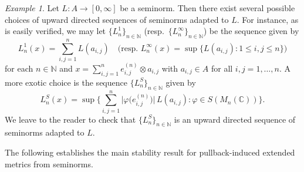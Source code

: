 \documentclass[11pt, a4paper, oneside, final, reqno]{amsart}
\newcommand{\bbN}{\mathbb{N}}
\newcommand{\bbC}{\mathbb{C}}
\theoremstyle{definition}
\theoremstyle{plain}
\theoremstyle{remark}
\newtheorem{example}[definition]{Example}
\numberwithin{equation}{section}
\begin{document}
\begin{example}\label{upward-ex}
    Let $L \colon A \to [0, \infty]$  be a seminorm. Then there exist several possible choices of upward directed sequences of seminorms adapted to $L$. For instance, as is easily verified, we may let $\{L_n^1\}_{n\in \bbN}$ (resp.~$\{L_n^\infty\}_{n\in \bbN}$) be the sequence given by
    \begin{equation*}
        L_n^1(x) = \sum_{i,j=1}^n L(a_{i,j}) \quad \text{(resp. } L_n^\infty(x) = \sup\{ L(a_{i,j}) : 1\leq i,j \leq n\}\text{)}
    \end{equation*}
    for each $n\in \bbN$ and $x=\sum_{i, j=1}^n  e_{i,j}^{(n)} \otimes a_{i, j}$ with $a_{i, j}\in A$ for all $i, j=1, \ldots, n$. A more exotic choice is the sequence $\{L_n^S\}_{n\in \bbN}$ given by
    \begin{equation*}
        L_n^S(x) = \sup\Big\{\sum_{i,j=1}^n \big| \varphi\big(e_{i,j}^{(n)}\big)\big| \, L(a_{i,j}) : \varphi\in S(M_n(\bbC))\Big\}.
    \end{equation*}
    We leave to the reader to check that $\{L_n^S\}_{n\in \bbN}$ is an upward directed sequence of seminorms adapted to $L$.
\end{example}

The following establishes the main stability result for pullback-induced extended metrics from seminorms. 
\end{document}
